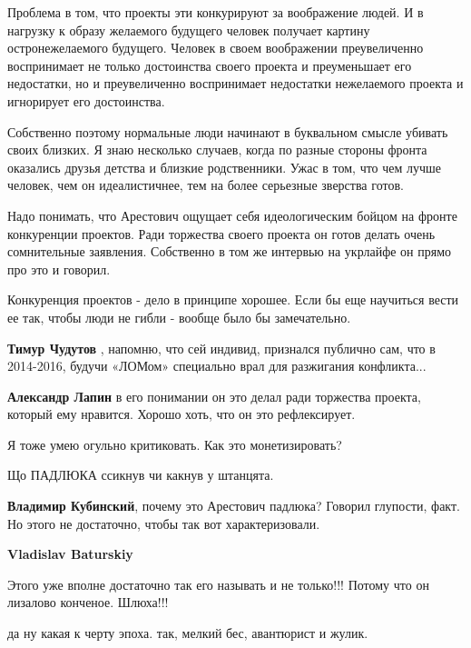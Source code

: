 \begin{itemize}
Проблема в том, что проекты эти конкурируют за воображение людей. И в нагрузку
к образу желаемого будущего человек получает картину остронежелаемого будущего.
Человек в своем воображении преувеличенно воспринимает не только достоинства
своего проекта и преуменьшает его недостатки, но и преувеличенно воспринимает
недостатки нежелаемого проекта и игнорирует его достоинства.

Собственно поэтому нормальные люди начинают в буквальном смысле убивать своих
близких. Я знаю несколько случаев, когда по разные стороны фронта оказались
друзья детства и близкие родственники. Ужас в том, что чем лучше человек, чем
он идеалистичнее, тем на более серьезные зверства готов.

Надо понимать, что Арестович ощущает себя идеологическим бойцом на фронте
конкуренции проектов. Ради торжества своего проекта он готов делать очень
сомнительные заявления. Собственно в том же интервью на укрлайфе он прямо про
это и говорил.

Конкуренция проектов - дело в принципе хорошее. Если бы еще научиться вести ее
так, чтобы люди не гибли - вообще было бы замечательно.

\begin{itemize} %
\textbf{Тимур Чудутов} , напомню, что сей индивид, признался публично сам, что в 2014-2016, будучи «ЛОМом» специально врал для разжигания конфликта...

\textbf{Александр Лапин} в его понимании он это делал ради торжества проекта, который ему нравится.
Хорошо хоть, что он это рефлексирует.
\end{itemize} %


Я тоже умею огульно критиковать. Как это монетизировать?

Що ПАДЛЮКА ссикнув чи какнув у штанцята.

\begin{itemize} %
\textbf{Владимир Кубинский}, почему это Арестович падлюка? Говорил глупости, факт. Но этого не достаточно, чтобы так вот характеризовали.

\textbf{Vladislav Baturskiy}

Этого уже вполне достаточно так его называть и не только!!! Потому что он
лизалово конченое. Шлюха!!!

\end{itemize} %

да ну какая к черту эпоха. так, мелкий бес, авантюрист и жулик.


\end{itemize}
